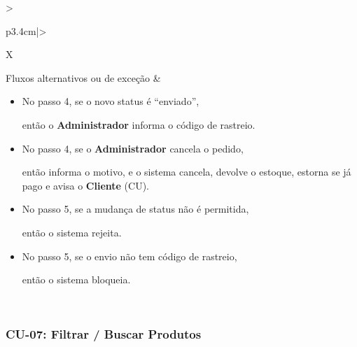 \documentclass[12pt,a4paper]{article}
\begin{document}
{\begin{xltabular}{\textwidth}{>{\raggedright\arraybackslash}p{3.4cm}|>{\raggedright\arraybackslash}X}
Fluxos alternativos ou de exceção & \begin{itemize}[nosep,leftmargin=2.2em,labelwidth=2.2em,labelsep=0pt,align=left,itemsep=4pt,before=\vspace{-\baselineskip},after=\vspace{-0.4\baselineskip}]\item[\textbf{A1}] No passo 4, se o novo status é ``enviado'',\par então o \textbf{Administrador} informa o código de rastreio. \item[\textbf{A2}] No passo 4, se o \textbf{Administrador} cancela o pedido,\par então informa o motivo, e o sistema cancela, devolve o estoque, estorna se já pago e avisa o \textbf{Cliente} (CU). \item[\textbf{E1}] No passo 5, se a mudança de status não é permitida,\par então o sistema rejeita. \item[\textbf{E2}] No passo 5, se o envio não tem código de rastreio,\par então o sistema bloqueia.\end{itemize}\\ \bottomrule
\end{xltabular}}

\Needspace{200pt}
\subsubsection{CU-07: Filtrar / Buscar Produtos}
\end{document}
